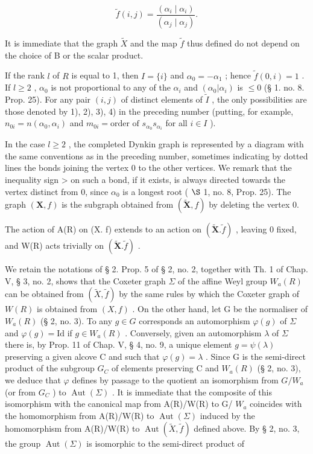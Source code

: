 \[
\tilde {f} (i, j) = \frac {\left(\alpha_ {i} \mid \alpha_ {i}\right)}{\left(\alpha_ {j} \mid \alpha_ {j}\right)}.
\]

It is immediate that the graph \(\tilde{X}\) and the map \(\tilde{f}\) thus defined do not depend on the choice of B or the scalar product.

If the rank \(l\) of \(R\) is equal to 1, then \(I = \{i\}\) and \(\alpha_0 = -\alpha_1\) ; hence \(\tilde{f}(0, i) = 1\) . If \(l \geqslant 2\) , \(\alpha_0\) is not proportional to any of the \(\alpha_i\) and \((\alpha_0|\alpha_i)\) is \(\leqslant 0\) (§ 1. no. 8. Prop. 25). For any pair \((i,j)\) of distinct elements of \(\tilde{I}\) , the only possibilities are those denoted by 1), 2), 3), 4) in the preceding number (putting, for example, \(n_{0i} = n(\alpha_0, \alpha_i)\) and \(m_{0i} = \text{order of } s_{\alpha_0}s_{\alpha_i}\) for all \(i \in I\) ).

In the case \(l \geqslant 2\) , the completed Dynkin graph is represented by a diagram with the same conventions as in the preceding number, sometimes indicating by dotted lines the bonds joining the vertex 0 to the other vertices. We remark that the inequality sign \textgreater{} on such a bond, if it exists, is always directed towards the vertex distinct from 0, since \(\alpha_{0}\) is a longest root ( \(\S\) 1, no. 8, Prop. 25). The graph \((\mathbf{X}, f)\) is the subgraph obtained from \((\tilde{\mathbf{X}}, f)\) by deleting the vertex 0.

The action of A(R) on (X. f) extends to an action on \((\tilde{\mathbf{X}}.\tilde{f})\) , leaving 0 fixed, and W(R) acts trivially on \((\tilde{\mathbf{X}}.\tilde{f})\) .

We retain the notations of § 2. Prop. 5 of § 2, no. 2, together with Th. 1 of Chap. V, § 3, no. 2, shows that the Coxeter graph \(\Sigma\) of the affine Weyl group \(W_{a}(R)\) can be obtained from \((\tilde{X},\tilde{f})\) by the same rules by which the Coxeter graph of \(W(R)\) is obtained from \((X,f)\) . On the other hand, let G be the normaliser of \(W_{a}(R)\) (§ 2, no. 3). To any \(g\in G\) corresponds an automorphism \(\varphi(g)\) of \(\Sigma\) and \(\varphi(g)=\mathrm{Id}\) if \(g\in W_{a}(R)\) . Conversely, given an automorphism \(\lambda\) of \(\Sigma\) there is, by Prop. 11 of Chap. V, § 4, no. 9, a unique element \(g=\psi(\lambda)\) preserving a given alcove C and such that \(\varphi(g)=\lambda\) . Since G is the semi-direct product of the subgroup \(G_{C}\) of elements preserving C and \(W_{a}(R)\) (§ 2, no. 3), we deduce that \(\varphi\) defines by passage to the quotient an isomorphism from \(G/W_{a}\) (or from \(G_{C}\) ) to \(\operatorname{Aut}(\Sigma)\) . It is immediate that the composite of this isomorphism with the canonical map from A(R)/W(R) to G/ \(W_{a}\) coincides with the homomorphism from A(R)/W(R) to \(\operatorname{Aut}(\Sigma)\) induced by the homomorphism from A(R)/W(R) to \(\operatorname{Aut}(\tilde{X},\tilde{f})\) defined above. By § 2, no. 3, the group \(\operatorname{Aut}(\Sigma)\) is isomorphic to the semi-direct product of

